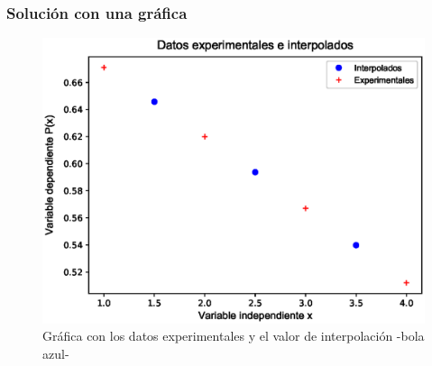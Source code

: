 \begin{frame}
\frametitle{Solución con una gráfica}
\begin{figure}
	\centering
	\includegraphics[scale=0.5]{Imagenes/InterpLagrangen3_02.eps}
	\caption{Gráfica con los datos experimentales y el valor de interpolación -bola azul-}
\end{figure}
\end{frame}
